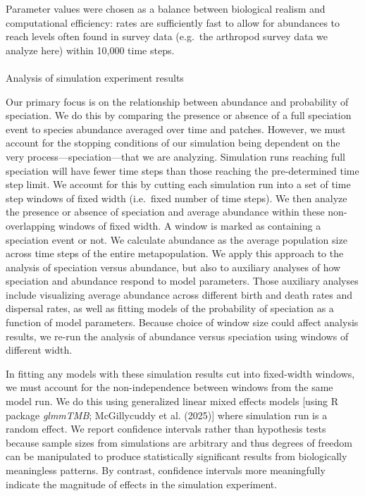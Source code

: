 \documentclass[
  letterpaper,
  DIV=11,
  numbers=noendperiod]{scrartcl}
\makeatletter
\let\oldparagraph\paragraph
\renewcommand{\paragraph}{
    \@ifstar
      \xxxParagraphStar
      \xxxParagraphNoStar
  }
\newcommand{\xxxParagraphStar}[1]{\oldparagraph*{#1}\mbox{}}
\newcommand{\xxxParagraphNoStar}[1]{\oldparagraph{#1}\mbox{}}
\makeatother
\begin{document}
Parameter values were chosen as a balance between biological realism and
computational efficiency: rates are sufficiently fast to allow for
abundances to reach levels often found in survey data (e.g.~the
arthropod survey data we analyze here) within 10,000 time steps.

\paragraph{Analysis of simulation experiment
results}\label{analysis-of-simulation-experiment-results}

Our primary focus is on the relationship between abundance and
probability of speciation. We do this by comparing the presence or
absence of a full speciation event to species abundance averaged over
time and patches. However, we must account for the stopping conditions
of our simulation being dependent on the very
process---speciation---that we are analyzing. Simulation runs reaching
full speciation will have fewer time steps than those reaching the
pre-determined time step limit. We account for this by cutting each
simulation run into a set of time step windows of fixed width
(i.e.~fixed number of time steps). We then analyze the presence or
absence of speciation and average abundance within these non-overlapping
windows of fixed width. A window is marked as containing a speciation
event or not. We calculate abundance as the average population size
across time steps of the entire metapopulation. We apply this approach
to the analysis of speciation versus abundance, but also to auxiliary
analyses of how speciation and abundance respond to model parameters.
Those auxiliary analyses include visualizing average abundance across
different birth and death rates and dispersal rates, as well as fitting
models of the probability of speciation as a function of model
parameters. Because choice of window size could affect analysis results,
we re-run the analysis of abundance versus speciation using windows of
different width.

In fitting any models with these simulation results cut into fixed-width
windows, we must account for the non-independence between windows from
the same model run. We do this using generalized linear mixed effects
models {[}using R package \emph{glmmTMB}; McGillycuddy et al. (2025){]}
where simulation run is a random effect. We report confidence intervals
rather than hypothesis tests because sample sizes from simulations are
arbitrary and thus degrees of freedom can be manipulated to produce
statistically significant results from biologically meaningless
patterns. By contrast, confidence intervals more meaningfully indicate
the magnitude of effects in the simulation experiment.
\end{document}
